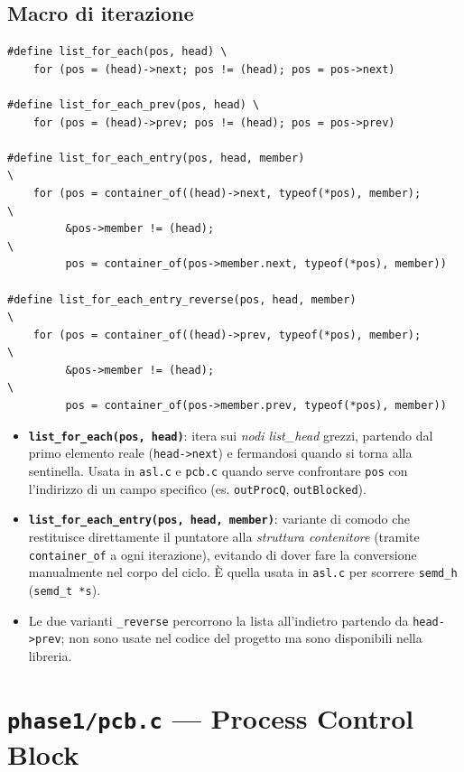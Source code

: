 \documentclass[11pt,a4paper]{article}
\newcommand{\code}[1]{\texttt{#1}}
\newcommand{\func}[1]{\textbf{\texttt{#1}}}
\begin{document}
\subsection{Macro di iterazione}
\begin{lstlisting}
#define list_for_each(pos, head) \
    for (pos = (head)->next; pos != (head); pos = pos->next)

#define list_for_each_prev(pos, head) \
    for (pos = (head)->prev; pos != (head); pos = pos->prev)

#define list_for_each_entry(pos, head, member)                              \
    for (pos = container_of((head)->next, typeof(*pos), member);            \
         &pos->member != (head);                                            \
         pos = container_of(pos->member.next, typeof(*pos), member))

#define list_for_each_entry_reverse(pos, head, member)                      \
    for (pos = container_of((head)->prev, typeof(*pos), member);            \
         &pos->member != (head);                                            \
         pos = container_of(pos->member.prev, typeof(*pos), member))
\end{lstlisting}
\begin{itemize}
\item \func{list\_for\_each(pos, head)}: itera sui \emph{nodi
  list\_head} grezzi, partendo dal primo elemento reale
  (\code{head->next}) e fermandosi quando si torna alla sentinella. Usata
  in \code{asl.c} e \code{pcb.c} quando serve confrontare \code{pos} con
  l'indirizzo di un campo specifico (es. \code{outProcQ}, \code{outBlocked}).
\item \func{list\_for\_each\_entry(pos, head, member)}: variante di
  comodo che restituisce direttamente il puntatore alla \emph{struttura
  contenitore} (tramite \code{container\_of} a ogni iterazione), evitando di
  dover fare la conversione manualmente nel corpo del ciclo. È quella usata
  in \code{asl.c} per scorrere \code{semd\_h} (\code{semd\_t *s}).
\item Le due varianti \code{\_reverse} percorrono la lista all'indietro
  partendo da \code{head->prev}; non sono usate nel codice del progetto ma
  sono disponibili nella libreria.
\end{itemize}

\section{\code{phase1/pcb.c} --- Process Control Block}
\end{document}
